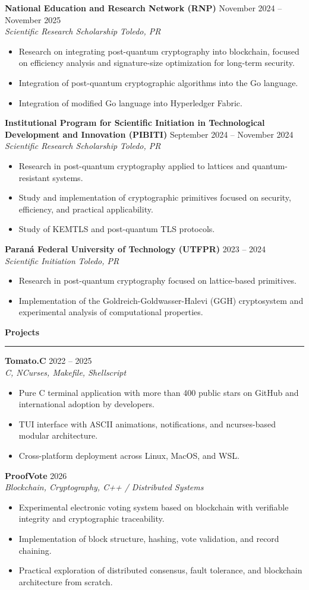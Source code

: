 \documentclass[letterpaper,11pt]{article}
\newcommand{\cvsection}[2][6pt]{
\vspace{#1}
{\large\bfseries\color{cvblue} #2}\\[-6pt]
{\color{cvblue}\rule{\textwidth}{0.4pt}}
\vspace{-6pt}
}
\newcommand{\cvtitle}[2]{
\textbf{#1} \hfill {\color{cvgray}#2}
}
\newcommand{\cvsubtitle}[2]{
\textit{\color{cvgray}#1} \hfill \textit{\color{cvgray}#2}
}
\newcommand{\cventry}[4]{
\cvtitle{#1}{#2}\\
\cvsubtitle{#3}{#4}
\vspace{2pt}
}
\newcommand{\cvbullet}[1]{
\item #1
}
\newcommand{\cvliststart}{
\begin{itemize}
}
\newcommand{\cvlistend}{
\end{itemize}
}
\begin{document}
\cventry
{National Education and Research Network (RNP)}
{November 2024 -- November 2025}
{Scientific Research Scholarship}
{Toledo, PR}

\cvliststart
\cvbullet{Research on integrating post-quantum cryptography into blockchain,
focused on efficiency analysis and signature-size optimization for
long-term security.}
\cvbullet{Integration of post-quantum cryptographic algorithms into the Go language.}
\cvbullet{Integration of modified Go language into Hyperledger Fabric.}
\cvlistend

\cventry
{Institutional Program for Scientific Initiation in Technological Development and Innovation (PIBITI)}
{September 2024 -- November 2024}
{Scientific Research Scholarship}
{Toledo, PR}

\cvliststart
\cvbullet{Research in post-quantum cryptography applied to lattices and quantum-resistant systems.}
\cvbullet{Study and implementation of cryptographic primitives focused on security, efficiency, and practical applicability.}
\cvbullet{Study of KEMTLS and post-quantum TLS protocols.}
\cvlistend

\cventry
{Paraná Federal University of Technology (UTFPR)}
{2023 -- 2024}
{Scientific Initiation}
{Toledo, PR}

\cvliststart
\cvbullet{Research in post-quantum cryptography focused on lattice-based primitives.}
\cvbullet{Implementation of the Goldreich-Goldwasser-Halevi (GGH) cryptosystem and experimental analysis of computational properties.}
\cvlistend

\newpage
\cvsection{Projects}

\cventry
{Tomato.C}
{2022 -- 2025}
{C, NCurses, Makefile, Shellscript}
{}

\cvliststart
\cvbullet{Pure C terminal application with more than 400 public stars on GitHub and international adoption by developers.}
\cvbullet{TUI interface with ASCII animations, notifications, and ncurses-based modular architecture.}
\cvbullet{Cross-platform deployment across Linux, MacOS, and WSL.}
\cvlistend

\cventry
{ProofVote}
{2026}
{Blockchain, Cryptography, C++ / Distributed Systems}
{}

\cvliststart
\cvbullet{Experimental electronic voting system based on blockchain with verifiable integrity and cryptographic traceability.}
\cvbullet{Implementation of block structure, hashing, vote validation, and record chaining.}
\cvbullet{Practical exploration of distributed consensus, fault tolerance, and blockchain architecture from scratch.}
\cvlistend
\end{document}
